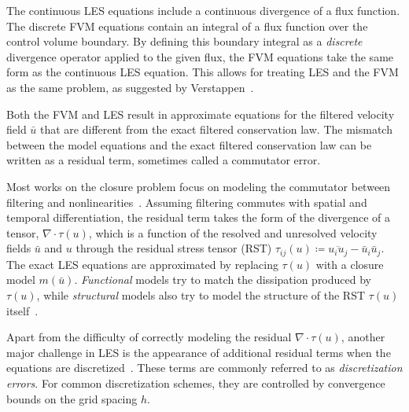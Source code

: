 \documentclass[preprint,twocolumn,5p]{elsarticle}
\begin{document}
The continuous LES equations include a continuous divergence of a flux function.
The discrete FVM equations contain an integral of a flux function over the
control volume boundary.
By defining this boundary integral as a \emph{discrete} divergence operator
applied to the given flux,
the FVM equations take the same form as the continuous LES equation.
This allows for treating LES and the FVM as the same problem, as suggested by
Verstappen~\cite{verstappenMergingFilteringModeling2025}.


Both the FVM and LES result in approximate equations for the filtered velocity
field $\bar{u}$ that are different from the exact filtered conservation law. The
mismatch between the model equations and the exact filtered conservation law can
be written as a residual term, sometimes called a commutator error.

Most works on the closure problem focus on
modeling the commutator between filtering and
nonlinearities~\cite{
popeTurbulentFlows2000,
berselliMathematicsLargeEddy2006,
sagautLargeEddySimulation2006}.
Assuming filtering commutes with
spatial and temporal differentiation, the residual term
takes the form of the divergence of a tensor,
$\nabla \cdot \tau(u)$,
which is a function of the resolved and unresolved velocity
fields $\bar{u}$ and $u$ through the residual stress tensor (RST)
$\tau_{i j}(u) \coloneq \overline{u_i u_j} - \bar{u}_i \bar{u}_j$.
The exact LES equations are approximated by replacing $\tau(u)$ with a closure
model $m(\bar{u})$. \emph{Functional} models try to match the dissipation
produced by $\tau(u)$,
while \emph{structural} models also try to model the structure of the RST
$\tau(u)$ itself~\cite{
sagautLargeEddySimulation2006,
luStructuralSubgridscaleModeling2016}.

Apart from the difficulty of correctly modeling the residual
$\nabla \cdot \tau(u)$,
another major challenge in LES is the appearance of additional
residual terms when the equations are
discretized~\cite{baeNumericalModelingError2022,
beckDiscretizationConsistentClosureSchemes2023}.
These terms are commonly referred to as
\emph{discretization errors}.
For common discretization schemes, they are controlled by convergence
bounds on the grid spacing $h$.
\end{document}
